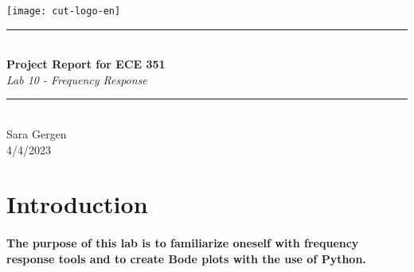 \documentclass[12pt,a4paper]{article}
\newcommand{\HRule}{\rule{\linewidth}{0.5mm}}
\begin{document}
\begin{titlepage}
\begin{center}

\texttt{[image: cut-logo-en]}~\\[2cm]


\HRule \\[0.4cm]
{ \LARGE 
  \textbf{Project Report for ECE 351}\\[0.4cm]
  \emph{Lab 10 - Frequency Response}\\[0.4cm]
}
\HRule \\[1. 5cm]



{ \large
  Sara Gergen \\[0.1cm]
  4/4/2023\\[0.1cm]
}

\vfill



\end{center}
\end{titlepage}


\newpage



\tableofcontents
{}
\newpage
\setcounter{page}{1}

\section{Introduction}\label{sec:intro}

\paragraph{The purpose of this lab is to familiarize oneself with frequency response tools and to create Bode plots with the use of Python.}
\end{document}
